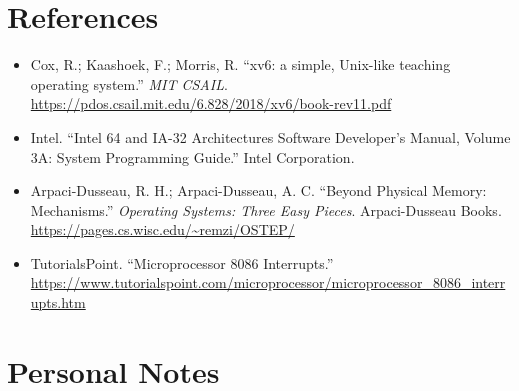 \documentclass[11pt]{article}
\begin{document}
\section{References}

\begin{itemize}
    \item Cox, R.; Kaashoek, F.; Morris, R. ``xv6: a simple, Unix-like teaching operating system.'' \textit{MIT CSAIL}. \url{https://pdos.csail.mit.edu/6.828/2018/xv6/book-rev11.pdf}
    \item Intel. ``Intel 64 and IA-32 Architectures Software Developer's Manual, Volume 3A: System Programming Guide.'' Intel Corporation.
    \item Arpaci-Dusseau, R. H.; Arpaci-Dusseau, A. C. ``Beyond Physical Memory: Mechanisms.'' \textit{Operating Systems: Three Easy Pieces}. Arpaci-Dusseau Books. \url{https://pages.cs.wisc.edu/~remzi/OSTEP/}
    \item TutorialsPoint. ``Microprocessor 8086 Interrupts.'' \url{https://www.tutorialspoint.com/microprocessor/microprocessor_8086_interrupts.htm}
\end{itemize}

\section*{Personal Notes}
\end{document}
